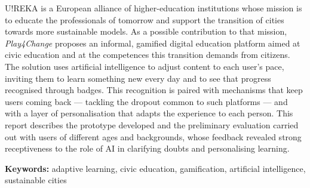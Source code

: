 \abstractEN %

U!REKA is a European alliance of higher-education institutions whose mission is to educate the professionals of tomorrow and support the transition of cities towards more sustainable models. As a possible contribution to that mission, \emph{Play4Change} proposes an informal, gamified digital education platform aimed at civic education and at the competences this transition demands from citizens. The solution uses artificial intelligence to adjust content to each user's pace, inviting them to learn something new every day and to see that progress recognised through badges. This recognition is paired with mechanisms that keep users coming back --- tackling the dropout common to such platforms --- and with a layer of personalisation that adapts the experience to each person. This report describes the prototype developed and the preliminary evaluation carried out with users of different ages and backgrounds, whose feedback revealed strong receptiveness to the role of AI in clarifying doubts and personalising learning.

\vspace{0.5cm}
\noindent\textbf{Keywords:} adaptive learning, civic education, gamification, artificial intelligence, sustainable cities
